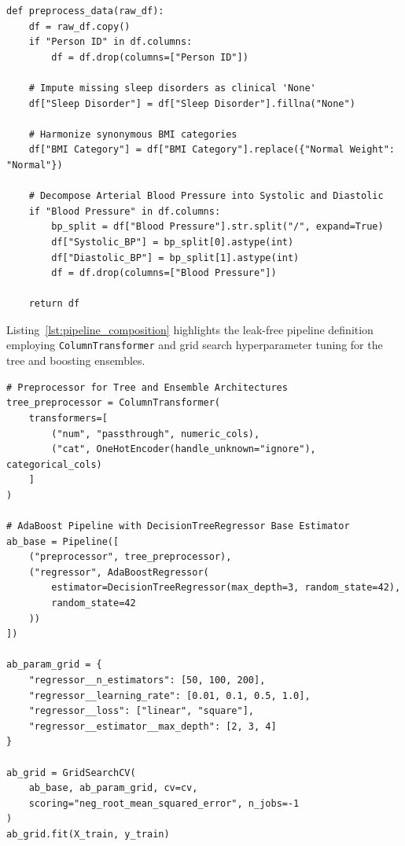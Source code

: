 \documentclass[12pt,a4paper]{article}
\begin{document}
\begin{lstlisting}[caption={Blood Pressure Decomposition and Categorical Sanitation in Python},label={lst:preprocessing}]
def preprocess_data(raw_df):
    df = raw_df.copy()
    if "Person ID" in df.columns:
        df = df.drop(columns=["Person ID"])
    
    # Impute missing sleep disorders as clinical 'None'
    df["Sleep Disorder"] = df["Sleep Disorder"].fillna("None")
    
    # Harmonize synonymous BMI categories
    df["BMI Category"] = df["BMI Category"].replace({"Normal Weight": "Normal"})
    
    # Decompose Arterial Blood Pressure into Systolic and Diastolic
    if "Blood Pressure" in df.columns:
        bp_split = df["Blood Pressure"].str.split("/", expand=True)
        df["Systolic_BP"] = bp_split[0].astype(int)
        df["Diastolic_BP"] = bp_split[1].astype(int)
        df = df.drop(columns=["Blood Pressure"])
        
    return df
\end{lstlisting}

Listing~\ref{lst:pipeline_composition} highlights the leak-free pipeline definition employing \texttt{ColumnTransformer} and grid search hyperparameter tuning for the tree and boosting ensembles.

\begin{lstlisting}[caption={Pipeline Composition and AdaBoost GridSearchCV Tuning},label={lst:pipeline_composition}]
# Preprocessor for Tree and Ensemble Architectures
tree_preprocessor = ColumnTransformer(
    transformers=[
        ("num", "passthrough", numeric_cols),
        ("cat", OneHotEncoder(handle_unknown="ignore"), categorical_cols)
    ]
)

# AdaBoost Pipeline with DecisionTreeRegressor Base Estimator
ab_base = Pipeline([
    ("preprocessor", tree_preprocessor),
    ("regressor", AdaBoostRegressor(
        estimator=DecisionTreeRegressor(max_depth=3, random_state=42),
        random_state=42
    ))
])

ab_param_grid = {
    "regressor__n_estimators": [50, 100, 200],
    "regressor__learning_rate": [0.01, 0.1, 0.5, 1.0],
    "regressor__loss": ["linear", "square"],
    "regressor__estimator__max_depth": [2, 3, 4]
}

ab_grid = GridSearchCV(
    ab_base, ab_param_grid, cv=cv,
    scoring="neg_root_mean_squared_error", n_jobs=-1
)
ab_grid.fit(X_train, y_train)
\end{lstlisting}
\end{document}
